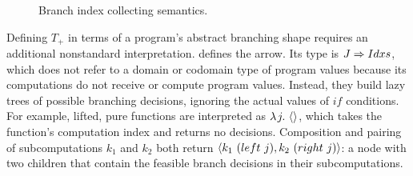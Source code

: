 \begin{figure}[!tb]

\caption[]{Branch index collecting semantics.}
\label{fig:collecting-semantics}
\end{figure}

Defining $T_+$ in terms of a program's abstract branching shape requires an additional nonstandard interpretation.
 defines the  arrow.
Its type is $J \Rightarrow Idxs$, which does not refer to a domain or codomain type of program values because its computations do not receive or compute program values.
Instead, they build lazy trees of possible branching decisions, ignoring the actual values of $if$ conditions.
For example, lifted, pure functions are interpreted as $\lambda\mspace{2mu}{j}\ldotp\, \langle{}\rangle$, which takes the function's computation index and returns no decisions.
Composition and pairing of subcomputations $k_1$ and $k_2$ both return $\langle{k_1~(left~j),k_2~(right~j)}\rangle$: a node with two children that contain the feasible branch decisions in their subcomputations.

